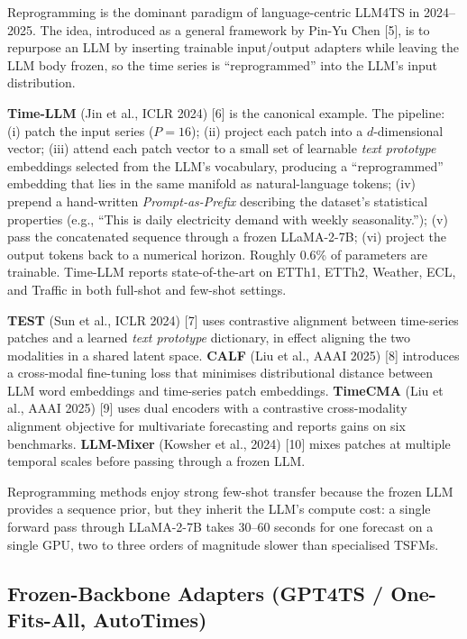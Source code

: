 Reprogramming is the dominant paradigm of language-centric LLM4TS in 2024--2025. The idea, introduced as a general framework by Pin-Yu Chen {[}5{]}, is to repurpose an LLM by inserting trainable input/output adapters while leaving the LLM body frozen, so the time series is ``reprogrammed'' into the LLM's input distribution.

\textbf{Time-LLM} (Jin et al., ICLR 2024) {[}6{]} is the canonical example. The pipeline: (i) patch the input series (\(P=16\)); (ii) project each patch into a \(d\)-dimensional vector; (iii) attend each patch vector to a small set of learnable \emph{text prototype} embeddings selected from the LLM's vocabulary, producing a ``reprogrammed'' embedding that lies in the same manifold as natural-language tokens; (iv) prepend a hand-written \emph{Prompt-as-Prefix} describing the dataset's statistical properties (e.g., ``This is daily electricity demand with weekly seasonality.''); (v) pass the concatenated sequence through a frozen LLaMA-2-7B; (vi) project the output tokens back to a numerical horizon. Roughly 0.6\% of parameters are trainable. Time-LLM reports state-of-the-art on ETTh1, ETTh2, Weather, ECL, and Traffic in both full-shot and few-shot settings.

\textbf{TEST} (Sun et al., ICLR 2024) {[}7{]} uses contrastive alignment between time-series patches and a learned \emph{text prototype} dictionary, in effect aligning the two modalities in a shared latent space. \textbf{CALF} (Liu et al., AAAI 2025) {[}8{]} introduces a cross-modal fine-tuning loss that minimises distributional distance between LLM word embeddings and time-series patch embeddings. \textbf{TimeCMA} (Liu et al., AAAI 2025) {[}9{]} uses dual encoders with a contrastive cross-modality alignment objective for multivariate forecasting and reports gains on six benchmarks. \textbf{LLM-Mixer} (Kowsher et al., 2024) {[}10{]} mixes patches at multiple temporal scales before passing through a frozen LLM.

Reprogramming methods enjoy strong few-shot transfer because the frozen LLM provides a sequence prior, but they inherit the LLM's compute cost: a single forward pass through LLaMA-2-7B takes 30--60 seconds for one forecast on a single GPU, two to three orders of magnitude slower than specialised TSFMs.

\subsection{Frozen-Backbone Adapters (GPT4TS / One-Fits-All, AutoTimes)}\label{frozen-backbone-adapters-gpt4ts-one-fits-all-autotimes}

